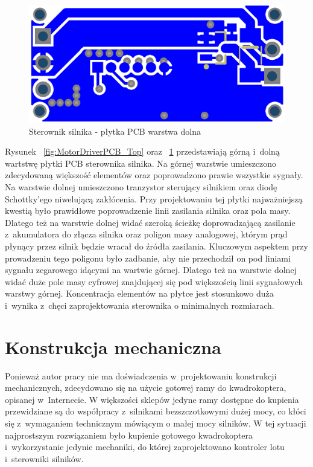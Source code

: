 \begin{figure}[H]
	\centering
	\includegraphics[scale=0.4]{Pictures/MotorDriverPCB_Bottom.png}
		\caption[Sterownik silnika - płytka PCB warstwa dolna]{Sterownik silnika - płytka PCB warstwa dolna}
	\label{fig:MotorDriverPCB_Bottom}
\end{figure}

Rysunek ~\ref{fig:MotorDriverPCB_Top} oraz ~\ref{fig:MotorDriverPCB_Bottom} przedstawiają górną i~dolną wartstwę płytki PCB sterownika silnika. Na górnej warstwie umieszczono zdecydowaną większość elementów oraz poprowadzono prawie wszystkie sygnały. Na warstwie dolnej umieszczono tranzystor sterujący silnikiem oraz diodę Schottky'ego niwelującą zakłócenia. Przy projektowaniu tej płytki najważniejszą kwestią było prawidłowe poprowadzenie linii zasilania silnika oraz pola masy. Dlatego też na warstwie dolnej widać szeroką ścieżkę doprowadzającą zasilanie z~akumulatora do złącza silnika oraz poligon masy analogowej, którym prąd płynący przez silnik będzie wracał do źródła zasilania. Kluczowym aspektem przy prowadzeniu tego poligonu było zadbanie, aby nie przechodził on pod liniami sygnału zegarowego idącymi na wartwie górnej. Dlatego też na warstwie dolnej widać duże pole masy cyfrowej znajdującej się pod większością linii sygnałowych warstwy górnej. Koncentracja elementów na płytce jest stosunkowo duża i~wynika z~chęci zaprojektowania sterownika o minimalnych rozmiarach. 

\section{Konstrukcja mechaniczna}

Ponieważ autor pracy nie ma doświadczenia w~projektowaniu konstrukcji mechanicznych, zdecydowano się na użycie gotowej ramy do kwadrokoptera, opisanej w~Internecie. W większości sklepów jedyne ramy dostępne do kupienia przewidziane są do współpracy z~silnikami bezszczotkowymi dużej mocy, co kłóci się z~wymaganiem technicznym mówiącym o małej mocy silników. W tej sytuacji najprostszym rozwiązaniem było kupienie gotowego kwadrokoptera i~wykorzystanie jedynie mechaniki, do której zaprojektowano kontroler lotu i~sterowniki silników. 


